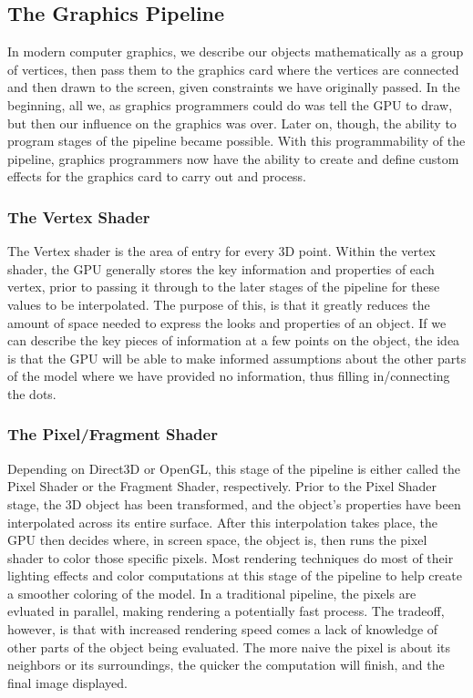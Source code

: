 \documentclass[a4paper, 12pt]{article}
\begin{document}
\subsection{The Graphics Pipeline}

In modern computer graphics, we describe our objects mathematically as a group
of vertices, then pass them to the graphics card where the vertices are
connected and then drawn to the screen, given constraints we have originally
passed. In the beginning, all we, as graphics programmers could do was tell
the GPU to draw, but then our influence on the graphics was over. Later on,
though, the ability to program stages of the pipeline became possible. With
this programmability of the pipeline, graphics programmers now have the
ability to create and define custom effects for the graphics card to carry out
and process.

\subsubsection{The Vertex Shader}

The Vertex shader is the area of entry for every 3D point. Within the vertex
shader, the GPU generally stores the key information and properties of each
vertex, prior to passing it through to the later stages of the pipeline for
these values to be interpolated. The purpose of this, is that it greatly
reduces the amount of space needed to express the looks and properties of an
object. If we can describe the key pieces of information at a few points on
the object, the idea is that the GPU will be able to make informed assumptions
about the other parts of the model where we have provided no information, thus
filling in/connecting the dots.

\subsubsection{The Pixel/Fragment Shader}

Depending on Direct3D or OpenGL, this stage of the pipeline is either called
the Pixel Shader or the Fragment Shader, respectively. Prior to the Pixel
Shader stage, the 3D object has been transformed, and the object's properties
have been interpolated across its entire surface. After this interpolation
takes place, the GPU then decides where, in screen space, the object is, then
runs the pixel shader to color those specific pixels. Most rendering
techniques do most of their lighting effects and color computations at this
stage of the pipeline to help create a smoother coloring of the model. In a
traditional pipeline, the pixels are evluated in parallel, making rendering a
potentially fast process. The tradeoff, however, is that with increased
rendering speed comes a lack of knowledge of other parts of the object being
evaluated. The more naive the pixel is about its neighbors or its
surroundings, the quicker the computation will finish, and the final image
displayed.
\end{document}
